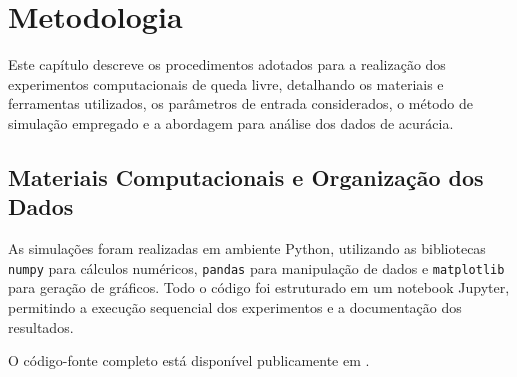 \chapter{Metodologia}
\label{chap_metodologia}
Este capítulo descreve os procedimentos adotados para a realização dos experimentos computacionais de queda livre, detalhando os materiais e ferramentas utilizados, os parâmetros de entrada considerados, o método de simulação empregado e a abordagem para análise dos dados de acurácia.

\section{Materiais Computacionais e Organização dos Dados}


As simulações foram realizadas em ambiente Python, utilizando as bibliotecas \texttt{numpy} para cálculos numéricos, \texttt{pandas} para manipulação de dados e \texttt{matplotlib} para geração de gráficos. Todo o código foi estruturado em um notebook Jupyter, permitindo a execução sequencial dos experimentos e a documentação dos resultados.

O código-fonte completo está disponível publicamente em \cite{github_queda_livre}.

